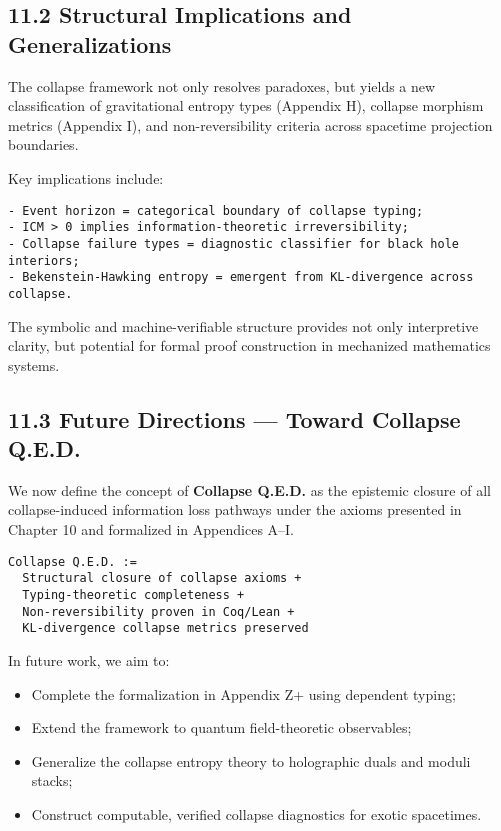\documentclass[11pt]{article}
\begin{document}
\subsection*{11.2 Structural Implications and Generalizations}

The collapse framework not only resolves paradoxes, but yields a new classification of gravitational entropy types (Appendix H), collapse morphism metrics (Appendix I), and non-reversibility criteria across spacetime projection boundaries.

Key implications include:

\begin{lstlisting}
- Event horizon = categorical boundary of collapse typing;
- ICM > 0 implies information-theoretic irreversibility;
- Collapse failure types = diagnostic classifier for black hole interiors;
- Bekenstein-Hawking entropy = emergent from KL-divergence across collapse.
\end{lstlisting}


The symbolic and machine-verifiable structure provides not only interpretive clarity, but potential for formal proof construction in mechanized mathematics systems.

\subsection*{11.3 Future Directions — Toward Collapse Q.E.D.}

We now define the concept of \textbf{Collapse Q.E.D.} as the epistemic closure of all collapse-induced information loss pathways under the axioms presented in Chapter 10 and formalized in Appendices A–I.

\begin{lstlisting}
Collapse Q.E.D. :=
  Structural closure of collapse axioms +
  Typing-theoretic completeness +
  Non-reversibility proven in Coq/Lean +
  KL-divergence collapse metrics preserved
\end{lstlisting}

In future work, we aim to:

\begin{itemize}
  \item Complete the formalization in Appendix Z+ using dependent typing;
  \item Extend the framework to quantum field-theoretic observables;
  \item Generalize the collapse entropy theory to holographic duals and moduli stacks;
  \item Construct computable, verified collapse diagnostics for exotic spacetimes.
\end{itemize}
\end{document}
